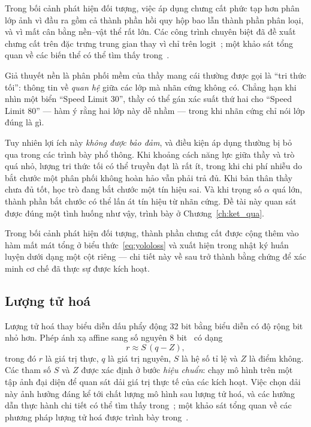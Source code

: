 Trong bối cảnh phát hiện đối tượng, việc áp dụng chưng cất phức tạp hơn phân lớp ảnh vì đầu ra gồm
cả thành phần hồi quy hộp bao lẫn thành phần phân loại, và vì mất cân bằng nền--vật thể rất lớn.
Các công trình chuyên biệt đã đề xuất chưng cất trên đặc trưng trung gian thay vì chỉ trên
logit~\cite{chen2017kddetection,li2017mimicking}; một khảo sát tổng quan về các biến thể có thể tìm
thấy trong~\cite{gou2021kdsurvey}.

Giả thuyết nền là phân phối mềm của thầy mang cái thường được gọi là ``tri thức tối'': thông tin về
\emph{quan hệ} giữa các lớp mà nhãn cứng không có. Chẳng hạn khi nhìn một biển ``Speed Limit 30'',
thầy có thể gán xác suất thứ hai cho ``Speed Limit 80'' --- hàm ý rằng hai lớp này dễ nhầm --- trong
khi nhãn cứng chỉ nói lớp đúng là gì.

Tuy nhiên lợi ích này \emph{không được bảo đảm}, và điều kiện áp dụng thường bị bỏ qua trong các
trình bày phổ thông. Khi khoảng cách năng lực giữa thầy và trò quá nhỏ, lượng tri thức tối có thể
truyền đạt là rất ít, trong khi chi phí nhiễu do bắt chước một phân phối không hoàn hảo vẫn phải
trả đủ. Khi bản thân thầy chưa đủ tốt, học trò đang bắt chước một tín hiệu sai. Và khi trọng số
$\alpha$ quá lớn, thành phần bắt chước có thể lấn át tín hiệu từ nhãn cứng. Đề tài này quan sát
được đúng một tình huống như vậy, trình bày ở Chương~\ref{ch:ket_qua}.

Trong bối cảnh phát hiện đối tượng, thành phần chưng cất được cộng thêm vào hàm mất mát tổng ở
biểu thức~\eqref{eq:yololoss} và xuất hiện trong nhật ký huấn luyện dưới dạng một cột riêng --- chi
tiết này về sau trở thành bằng chứng để xác minh cơ chế đã thực sự được kích hoạt.

\subsection{Lượng tử hoá}
\label{sec:quant_lythuyet}

Lượng tử hoá thay biểu diễn dấu phẩy động 32 bit bằng biểu diễn có độ rộng bit nhỏ hơn. Phép ánh xạ
affine sang số nguyên 8 bit~\cite{jacob2018quantization} có dạng
\begin{equation}
\label{eq:quant}
r \approx S\,(q - Z),
\end{equation}
trong đó $r$ là giá trị thực, $q$ là giá trị nguyên, $S$ là hệ số tỉ lệ và $Z$ là điểm không. Các
tham số $S$ và $Z$ được xác định ở bước \emph{hiệu chuẩn}: chạy mô hình trên một tập ảnh đại diện để
quan sát dải giá trị thực tế của các kích hoạt. Việc chọn dải này ảnh hưởng đáng kể tới chất lượng
mô hình sau lượng tử hoá, và các hướng dẫn thực hành chi tiết có thể tìm thấy
trong~\cite{krishnamoorthi2018quantizing,nagel2021quantwhitepaper}; một khảo sát tổng quan về các
phương pháp lượng tử hoá được trình bày trong~\cite{gholami2022quantsurvey}.

